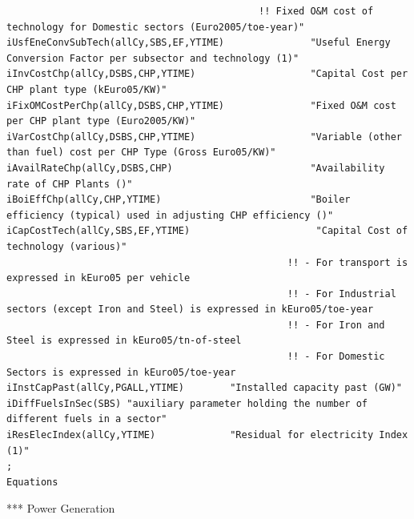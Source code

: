 \documentclass[a4paper,]{scrartcl}
\begin{document}
\begin{lstlisting}
                                            !! Fixed O&M cost of technology for Domestic sectors (Euro2005/toe-year)"
iUsfEneConvSubTech(allCy,SBS,EF,YTIME)               "Useful Energy Conversion Factor per subsector and technology (1)"
iInvCostChp(allCy,DSBS,CHP,YTIME)                    "Capital Cost per CHP plant type (kEuro05/KW)"
iFixOMCostPerChp(allCy,DSBS,CHP,YTIME)               "Fixed O&M cost per CHP plant type (Euro2005/KW)"
iVarCostChp(allCy,DSBS,CHP,YTIME)                    "Variable (other than fuel) cost per CHP Type (Gross Euro05/KW)"
iAvailRateChp(allCy,DSBS,CHP)                        "Availability rate of CHP Plants ()"
iBoiEffChp(allCy,CHP,YTIME)                          "Boiler efficiency (typical) used in adjusting CHP efficiency ()"
iCapCostTech(allCy,SBS,EF,YTIME)                      "Capital Cost of technology (various)"
                                                 !! - For transport is expressed in kEuro05 per vehicle
                                                 !! - For Industrial sectors (except Iron and Steel) is expressed in kEuro05/toe-year
                                                 !! - For Iron and Steel is expressed in kEuro05/tn-of-steel
                                                 !! - For Domestic Sectors is expressed in kEuro05/toe-year
iInstCapPast(allCy,PGALL,YTIME)        "Installed capacity past (GW)"
iDiffFuelsInSec(SBS) "auxiliary parameter holding the number of different fuels in a sector"
iResElecIndex(allCy,YTIME)             "Residual for electricity Index (1)"
;
Equations
\end{lstlisting}

*** Power Generation
\end{document}
